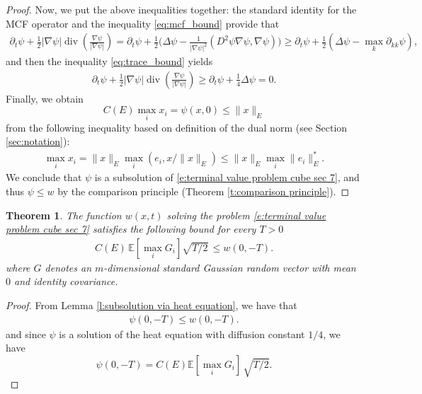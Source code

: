 \documentclass[reqno]{amsart}
\newtheorem{theorem}{Theorem}[section]
\numberwithin{equation}{section}
\DeclareMathOperator{\dive}{div}
\begin{document}
\begin{proof}
Now, we put the above inequalities together: the standard identity for the MCF operator and the inequality  \eqref{eq:mcf_bound} provide that
\begin{align*}
  \partial_t\psi + \tfrac{1}{2}|\nabla \psi|\dive\left ( \frac{\nabla \psi}{|\nabla \psi|} \right ) =\partial_t\psi + \tfrac{1}{2}\Big( \Delta \psi - \frac{1}{|\nabla \psi|^2}(D^2\psi \nabla \psi,\nabla \psi) \Big)\geq \partial_t\psi  + \tfrac{1}{2}\left ( \Delta \psi -\max_k \partial_{kk}\psi\right ),
\end{align*}
and then the inequality \eqref{eq:trace_bound} yields
\begin{align*}
  \partial_t\psi + \tfrac{1}{2}|\nabla \psi|\dive\left ( \frac{\nabla \psi}{|\nabla \psi|} \right ) \geq \partial_t\psi  + \tfrac{1}{4}\Delta \psi = 0.
\end{align*}    
Finally, we obtain
\[
C(E) \max_i x_i = \psi(x,0)  \leq \|x\|_E
\] from the following inequality based on definition of the dual norm (see Section \ref{sec:notation}): 
\begin{align*}
\max_i x_i = \|x\|_E \max_i ( e_i, x/\|x\|_E ) \leq \|x\|_E \max_i \|e_i\|^*_E.
\end{align*}
We conclude that $\psi$ is a subsolution of \eqref{e:terminal value problem cube sec 7}, and thus $\psi \leq w$ by the comparison principle (Theorem \ref{t:comparison principle}).

\end{proof}

\begin{theorem}
    
The function $w(x,t)$ solving the problem \eqref{e:terminal value problem cube sec 7} satisfies the following bound for every $T>0$
\begin{align*}
C(E) \, \mathbb E[ \max _i G_i] \sqrt{T/2}\,   \leq  w(0,-T).
\end{align*} where $G$ denotes an $m$-dimensional standard Gaussian random vector with mean $0$ and identity covariance. 
\end{theorem}

\begin{proof}

From Lemma \ref{l:subsolution via heat equation}, we have that 
\begin{align*}
  \psi(0,-T) \leq w(0,-T).
\end{align*}
and since $\psi$ is a solution of the heat equation with diffusion constant $1/4$, we have 
\[
\psi(0,-T) =C(E) \mathbb E [\max _i G_i ]\, \sqrt{T/2}.
\]

\end{proof}
 
\end{document}

